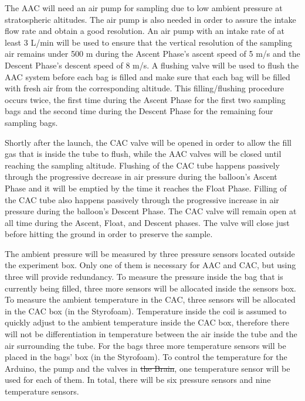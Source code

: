 \documentclass[a4paper,12pt,twoside]{article}
\providecommand{\DIFaddtex}[1]{{\protect\color{blue}\uwave{#1}}} %
\providecommand{\DIFdeltex}[1]{{\protect\color{red}\sout{#1}}}                      %
\providecommand{\DIFaddbegin}{} %
\providecommand{\DIFaddend}{} %
\providecommand{\DIFdelbegin}{} %
\providecommand{\DIFdelend}{} %
\providecommand{\DIFadd}[1]{\texorpdfstring{\DIFaddtex{#1}}{#1}} %
\providecommand{\DIFdel}[1]{\texorpdfstring{\DIFdeltex{#1}}{}} %
\newcommand{\DIFscaledelfig}{0.5}
\newlength{\DIFdelgraphicswidth} %
\newlength{\DIFdelgraphicsheight} %
\newcommand{\DIFaddincludegraphics}[2][]{{\color{blue}\fbox{\DIFOincludegraphics[#1]{#2}}}} %
\newcommand{\DIFdelincludegraphics}[2][]{%
\sbox{\DIFdelgraphicsbox}{\DIFOincludegraphics[#1]{#2}}%
\settoboxwidth{\DIFdelgraphicswidth}{\DIFdelgraphicsbox} %
\settoboxtotalheight{\DIFdelgraphicsheight}{\DIFdelgraphicsbox} %
\scalebox{\DIFscaledelfig}{%
\parbox[b]{\DIFdelgraphicswidth}{\usebox{\DIFdelgraphicsbox}\\[-\baselineskip] \rule{\DIFdelgraphicswidth}{0em}}\llap{\resizebox{\DIFdelgraphicswidth}{\DIFdelgraphicsheight}{%
\setlength{\unitlength}{\DIFdelgraphicswidth}%
\begin{picture}(1,1)%
\thicklines\linethickness{2pt} %
{\color[rgb]{1,0,0}\put(0,0){\framebox(1,1){}}}%
{\color[rgb]{1,0,0}\put(0,0){\line( 1,1){1}}}%
{\color[rgb]{1,0,0}\put(0,1){\line(1,-1){1}}}%
\end{picture}%
}\hspace*{3pt}}} %
} %
\DeclareRobustCommand{\DIFaddbegin}{\DIFOaddbegin \let\includegraphics\DIFaddincludegraphics} %
\DeclareRobustCommand{\DIFaddend}{\DIFOaddend \let\includegraphics\DIFOincludegraphics} %
\DeclareRobustCommand{\DIFdelbegin}{\DIFOdelbegin \let\includegraphics\DIFdelincludegraphics} %
\DeclareRobustCommand{\DIFdelend}{\DIFOaddend \let\includegraphics\DIFOincludegraphics} %
\begin{document}
The AAC will need an air pump for sampling due to low ambient pressure at stratospheric altitudes. The air pump is also needed in order to assure the intake flow rate and obtain a good resolution. An air pump with an intake rate of at least 3 L/min will be used to ensure that the vertical resolution of the sampling air remains under 500 m during the Ascent Phase's ascent speed of 5 m/s and the  Descent Phase's descent speed of 8 m/s. A flushing valve \DIFaddbegin \DIFadd{(see Figure \ref{pneumatic_system}, No.23) }\DIFaddend will be used to flush the AAC system before each bag is filled and make sure that each bag will be filled with fresh air from the corresponding altitude. This filling/flushing procedure occurs twice, the first time during the Ascent Phase for the first two sampling bags and the second time during the Descent Phase for the remaining four sampling bags.

Shortly after the launch, the CAC valve will be opened in order to allow the fill gas that is inside the tube to flush, while the AAC valves will be closed until reaching the sampling altitude. Flushing of the CAC tube happens passively through the progressive decrease in air pressure during the balloon's Ascent Phase and it will be emptied by the time it reaches the Float Phase. Filling of the CAC tube also happens passively through the progressive increase in air pressure during the balloon's Descent Phase. The CAC valve will remain open at all time during the Ascent, Float, and Descent phases. The valve will close just before hitting the ground in order to preserve the sample. 

The ambient pressure will be measured by three pressure sensors located outside the experiment box. Only one of them is necessary for AAC and CAC, but using three will provide redundancy. To measure the pressure inside the bag that is currently being filled, three more sensors will be allocated inside the sensors box. To measure the ambient temperature in the CAC, three sensors will be allocated in the CAC box (in the Styrofoam). Temperature inside the coil is assumed to quickly adjust to the ambient temperature inside the CAC box, therefore there will not be differentiation in temperature between the air inside the tube and the air surrounding the tube. For the bags three more temperature sensors will be placed in the bags' box (in the Styrofoam). To control the temperature for the Arduino, the pump and the valves in \DIFdelbegin \DIFdel{the Brain}\DIFdelend \DIFaddbegin \DIFadd{pneumatic subsystem}\DIFaddend , one temperature sensor will be used for each of them. In total, there will be six pressure sensors and nine temperature sensors. 
\end{document}
